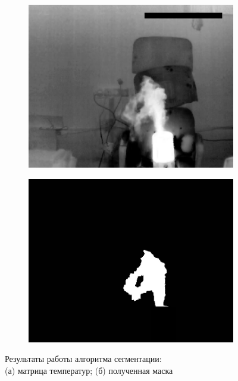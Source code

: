 \documentclass[14pt, a4paper]{extreport}
\begin{document}
	\begin{figure}[ht!]
		\begin{subfigure}{.49\textwidth}
			\centering
			\includegraphics[width = \textwidth]{image/chapter_3/tep_examp}
			\caption{}
		\end{subfigure}
		\begin{subfigure}{.49\textwidth}
			\centering
			\includegraphics[width = \textwidth]{image/chapter_3/mask}
			\caption{}
		\end{subfigure}
		\centering
		\caption{Результаты работы алгоритма сегментации:\\ (а) матрица температур; (б) полученная маска}
		\label{fig:Watershed_itog}
	\end{figure}
	
\end{document}
